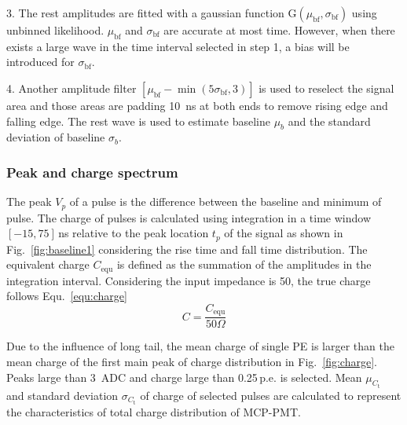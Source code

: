 3. The rest amplitudes are fitted with a gaussian function G$(\mu_{\mathrm{bf}},\sigma_{\mathrm{bf}})$ using unbinned likelihood. $\mu_{\mathrm{bf}}$ and $\sigma_{\mathrm{bf}}$ are accurate at most time. However, when there exists a large wave in the time interval selected in step 1, a bias will be introduced for $\sigma_{\mathrm{bf}}$.

4. Another amplitude filter $[\mu_{\mathrm{bf}}-\min(5\sigma_{\mathrm{bf}},3)]$ is used to reselect the signal area and those areas are padding \SI{10}{ns} at both ends to remove rising edge and falling edge. The rest wave is used to estimate baseline $\mu_b$ and the standard deviation of baseline $\sigma_b$.

\subsubsection{Peak and charge spectrum}
\label{sec:noisepeak}

The peak $V_p$ of a pulse is the difference between the baseline and minimum of pulse. The charge of pulses is calculated using integration in a time window $[-15, 75]$\,ns relative to the peak location $t_p$ of the signal as shown in Fig.~\ref{fig:baseline1} considering the rise time and fall time distribution. The equivalent charge $C_{\mathrm{equ}}$ is defined as the summation of the amplitudes in the integration interval. Considering the input impedance is \SI{50}{\Omega}, the true charge follows Equ.~\eqref{equ:charge} 
\begin{equation}
    \label{equ:charge}
    C = \frac{C_{\mathrm{equ}}}{50 \Omega}
\end{equation}

Due to the influence of long tail, the mean charge of single PE is larger than the mean charge of the first main peak of charge distribution in Fig.~\ref{fig:charge}. Peaks large than \SI{3}{ADC} and charge large than 0.25\,p.e. is selected. Mean $\mu_{C_{\mathrm{t}}}$ and standard deviation $\sigma_{C_{\mathrm{t}}}$ of charge of selected pulses are calculated to represent the characteristics of total charge distribution of MCP-PMT.

